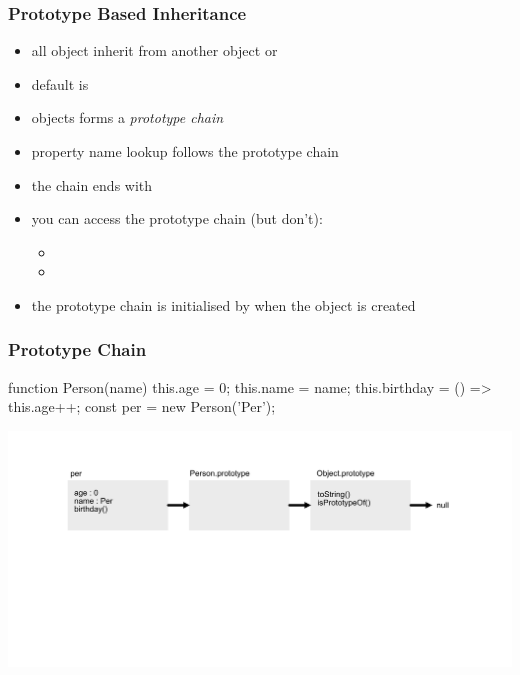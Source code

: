 \begin{frame}[fragile] \frametitle{Prototype Based Inheritance}

\begin{itemize}
  \item all object inherit from another object or 
  \item default is 
  \item objects forms a \emph{prototype chain}
  \item property name lookup follows the prototype chain
  \item the chain ends with 
  \item you can access the prototype chain (but don't):
  \begin{itemize}
    \item {}
    \item {}
  \end{itemize}
  \item the prototype chain is initialised by  when the object is created
\end{itemize}
\end{frame}

\begin{frame}[fragile]
\frametitle{Prototype Chain}
\begin{CodeBox}{}
function Person(name) {
  this.age = 0;
  this.name = name;
  this.birthday = () =>  this.age++;
}
const per = new Person('Per');
\end{CodeBox}
  \centering
  \includegraphics[width=14cm]{img/prototype_chain}

\end{frame}

